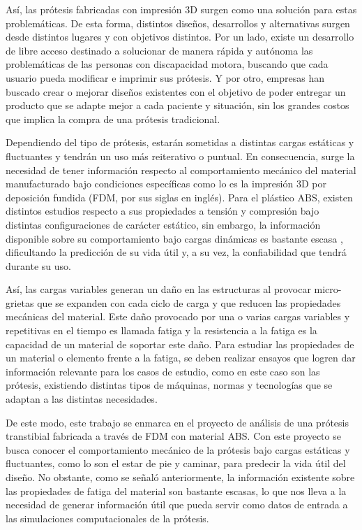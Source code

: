 Así, las prótesis fabricadas con impresión 3D surgen como una solución para estas problemáticas. De esta forma, distintos diseños, desarrollos y alternativas surgen desde distintos lugares y con objetivos distintos. Por un lado, existe un desarrollo de libre acceso destinado a solucionar de manera rápida y autónoma las problemáticas de las personas con discapacidad motora, buscando que cada usuario pueda modificar e imprimir sus prótesis. Y por otro, empresas han buscado crear o mejorar diseños existentes con el objetivo de poder entregar un producto que se adapte mejor a cada paciente y situación, sin los grandes costos que implica la compra de una prótesis tradicional.

Dependiendo del tipo de prótesis, estarán sometidas a distintas cargas estáticas y fluctuantes y tendrán un uso más reiterativo o puntual. En consecuencia, surge la necesidad de tener información respecto al comportamiento mecánico del material manufacturado bajo condiciones específicas como lo es la impresión 3D por deposición fundida (FDM, por sus siglas en inglés). Para el plástico ABS, existen distintos estudios respecto a sus propiedades a tensión y compresión bajo distintas configuraciones de carácter estático, sin embargo, la información disponible sobre su comportamiento bajo cargas dinámicas es bastante escasa \cite{lee2013fatigue}\cite{zhang2018tensile}, dificultando la predicción de su vida útil y, a su vez, la confiabilidad que tendrá durante su uso.

Así, las cargas variables generan un daño en las estructuras al provocar micro-grietas que se expanden con cada ciclo de carga y que reducen las propiedades mecánicas del material. Este daño provocado por una o varias cargas variables y repetitivas en el tiempo es llamada fatiga y la resistencia a la fatiga es la capacidad de un material de soportar este daño. Para estudiar las propiedades de un material o elemento frente a la fatiga, se deben realizar ensayos que logren dar información relevante para los casos de estudio, como en este caso son las prótesis, existiendo distintas tipos de máquinas, normas y tecnologías que se adaptan a las distintas necesidades.

De este modo, este trabajo se enmarca en el proyecto de análisis de una prótesis transtibial fabricada a través de FDM con material ABS. Con este proyecto se busca conocer el comportamiento mecánico de la prótesis bajo cargas estáticas y fluctuantes, como lo son el estar de pie y caminar, para predecir la vida útil del diseño. No obstante, como se señaló anteriormente, la información existente sobre las propiedades de fatiga del material son bastante escasas, lo que nos lleva a la necesidad de generar información útil que pueda servir como datos de entrada a las simulaciones computacionales de la prótesis.

